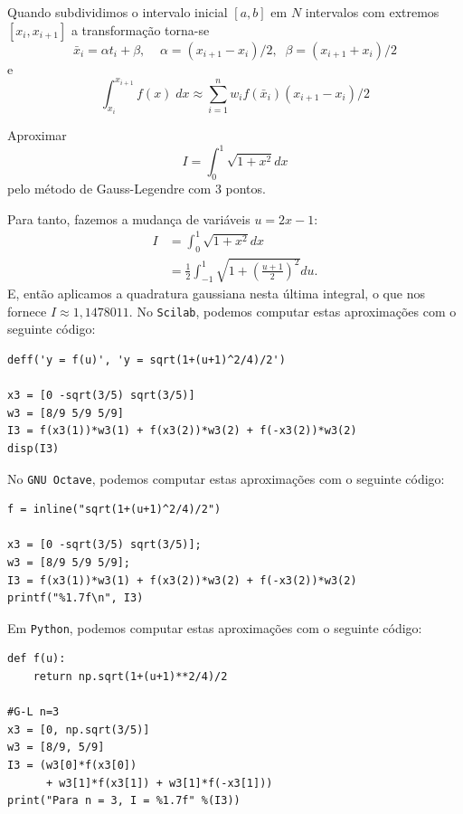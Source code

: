 Quando subdividimos o intervalo inicial $[a,b]$ em $N$ intervalos com extremos $[x_i,x_{i+1}]$ a transformação torna-se
\begin{equation}
  \bar{x}_i = \alpha t_i + \beta, \;\;  \;\; \alpha =(x_{i+1}-x_i)/2, \;\; \beta = (x_{i+1}+x_i)/2
\end{equation}
e
\begin{equation}
 \int_{x_i}^{x_{i+1}} f(x) \; dx \approx \sum_{i=1}^n w_i f( \bar{x}_i ) (x_{i+1}-x_i)/2
\end{equation}

\begin{ex} Aproximar
\begin{equation} I = \int_{0}^1\sqrt{1+x^2}dx \end{equation}
pelo método de Gauss-Legendre com 3 pontos.
\end{ex}
\begin{sol}
Para tanto, fazemos a mudança de variáveis $u=2x-1$:
\begin{equation}
  \begin{split}
    I &= \int_{0}^1\sqrt{1+x^2}dx\\
    &= \frac{1}{2}\int_{-1}^1\sqrt{1+\left(\frac{u+1}{2}\right)^2}du.
  \end{split}
\end{equation}
E, então aplicamos a quadratura gaussiana nesta última integral, o que nos fornece $I \approx 1,1478011$.
\ifisscilab
No \verb+Scilab+, podemos computar estas aproximações com o seguinte código:
\begin{verbatim}
deff('y = f(u)', 'y = sqrt(1+(u+1)^2/4)/2')

x3 = [0 -sqrt(3/5) sqrt(3/5)]
w3 = [8/9 5/9 5/9]
I3 = f(x3(1))*w3(1) + f(x3(2))*w3(2) + f(-x3(2))*w3(2)
disp(I3)
\end{verbatim}
\fi
\ifisoctave
No \verb+GNU Octave+, podemos computar estas aproximações com o seguinte código:
\begin{verbatim}
f = inline("sqrt(1+(u+1)^2/4)/2")

x3 = [0 -sqrt(3/5) sqrt(3/5)];
w3 = [8/9 5/9 5/9];
I3 = f(x3(1))*w3(1) + f(x3(2))*w3(2) + f(-x3(2))*w3(2)
printf("%1.7f\n", I3)
\end{verbatim}
\fi
\ifispython
Em \verb+Python+, podemos computar estas aproximações com o seguinte código:
\begin{verbatim}
def f(u):  
    return np.sqrt(1+(u+1)**2/4)/2  
 
#G-L n=3
x3 = [0, np.sqrt(3/5)]  
w3 = [8/9, 5/9]  
I3 = (w3[0]*f(x3[0])
      + w3[1]*f(x3[1]) + w3[1]*f(-x3[1]))
print("Para n = 3, I = %1.7f" %(I3))
\end{verbatim}
\fi
\end{sol}



